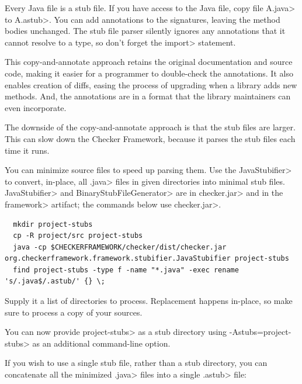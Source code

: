 


Every Java file is a stub file.  If you have access to the Java file,
copy file \<A.java> to \<A.astub>.  You can add
annotations to the signatures, leaving the method bodies unchanged.
The stub file parser silently ignores any annotations that it cannot
resolve to a type, so don't forget the \<import> statement.

This copy-and-annotate approach retains the original
documentation and source code, making it easier for a programmer to
double-check the annotations.  It also enables creation of diffs, easing
the process of upgrading when a library adds new methods.  And, the
annotations are in a format that the library maintainers can even
incorporate.

The downside of the copy-and-annotate approach is that the stub files are
larger.  This can
slow down the Checker Framework, because it parses the stub files each time
it runs.

You can minimize source files to speed up parsing them.
Use the \<JavaStubifier> to convert, in-place, all \<.java> files in given directories into
minimal stub files.
\<JavaStubifier> and \<BinaryStubFileGenerator> are in \<checker.jar> and in the
\<framework> artifact; the commands below use \<checker.jar>.

\begin{Verbatim}
  mkdir project-stubs
  cp -R project/src project-stubs
  java -cp $CHECKERFRAMEWORK/checker/dist/checker.jar org.checkerframework.framework.stubifier.JavaStubifier project-stubs
  find project-stubs -type f -name "*.java" -exec rename 's/.java$/.astub/' {} \;
\end{Verbatim}

Supply it a list of directories to process. Replacement happens in-place, so make sure to
process a copy of your sources.

You can now provide \<project-stubs> as a stub directory using \<-Astubs=project-stubs> as
an additional command-line option.

If you wish to use a single stub file, rather than a stub directory,
you can concatenate all the minimized \<.java> files into a single \<.astub> file:

